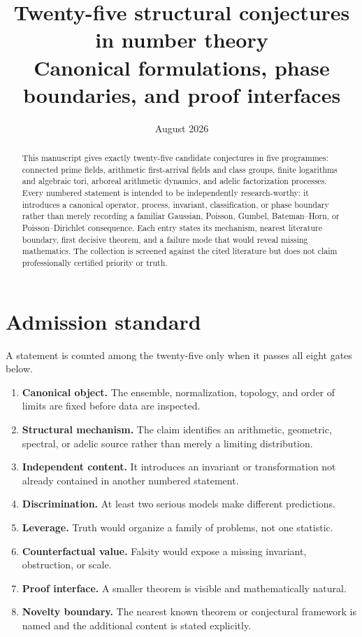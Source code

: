 \documentclass[11pt]{article}
\title{Twenty-five structural conjectures in number theory\\
\large Canonical formulations, phase boundaries, and proof interfaces}
\author{}
\date{August 2026}
\begin{document}
\maketitle

\begin{abstract}
This manuscript gives exactly twenty-five candidate conjectures in five programmes:
connected prime fields, arithmetic first-arrival fields and class groups, finite
logarithms and algebraic tori, arboreal arithmetic dynamics, and adelic factorization
processes.  Every numbered statement is intended to be independently research-worthy:
it introduces a canonical operator, process, invariant, classification, or phase
boundary rather than merely recording a familiar Gaussian, Poisson, Gumbel,
Bateman--Horn, or Poisson--Dirichlet consequence.  Each entry states its mechanism,
nearest literature boundary, first decisive theorem, and a failure mode that would reveal
missing mathematics.  The collection is screened against the cited literature but does
not claim professionally certified priority or truth.
\end{abstract}

\tableofcontents

\section{Admission standard}

A statement is counted among the twenty-five only when it passes all eight gates below.

\begin{enumerate}[label=\textbf{T\arabic*.},leftmargin=2.8em]
\item \textbf{Canonical object.} The ensemble, normalization, topology, and order of limits are fixed before data are inspected.
\item \textbf{Structural mechanism.} The claim identifies an arithmetic, geometric, spectral, or adelic source rather than merely a limiting distribution.
\item \textbf{Independent content.} It introduces an invariant or transformation not already contained in another numbered statement.
\item \textbf{Discrimination.} At least two serious models make different predictions.
\item \textbf{Leverage.} Truth would organize a family of problems, not one statistic.
\item \textbf{Counterfactual value.} Falsity would expose a missing invariant, obstruction, or scale.
\item \textbf{Proof interface.} A smaller theorem is visible and mathematically natural.
\item \textbf{Novelty boundary.} The nearest known theorem or conjectural framework is named and the additional content is stated explicitly.
\end{enumerate}
\end{document}
